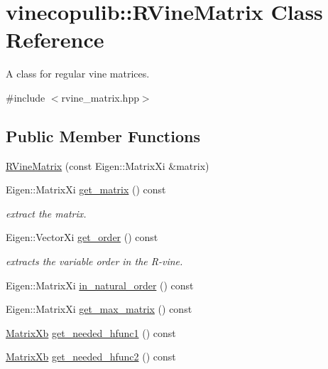 \hypertarget{classvinecopulib_1_1_r_vine_matrix}{}\section{vinecopulib\+:\+:R\+Vine\+Matrix Class Reference}
\label{classvinecopulib_1_1_r_vine_matrix}


A class for regular vine matrices.  




{\ttfamily \#include $<$rvine\+\_\+matrix.\+hpp$>$}

\subsection*{Public Member Functions}
\begin{DoxyCompactItemize}
\item 
\hyperlink{classvinecopulib_1_1_r_vine_matrix_a5872c479d4a7de9c2ddc64cdb0909ef9}{R\+Vine\+Matrix} (const Eigen\+::\+Matrix\+Xi \&matrix)
\item 
Eigen\+::\+Matrix\+Xi \hyperlink{classvinecopulib_1_1_r_vine_matrix_aef1ea47e9fcbcd32337b2db508b25fdb}{get\+\_\+matrix} () const \hypertarget{classvinecopulib_1_1_r_vine_matrix_aef1ea47e9fcbcd32337b2db508b25fdb}{}\label{classvinecopulib_1_1_r_vine_matrix_aef1ea47e9fcbcd32337b2db508b25fdb}

\begin{DoxyCompactList}\small\item\em extract the matrix. \end{DoxyCompactList}\item 
Eigen\+::\+Vector\+Xi \hyperlink{classvinecopulib_1_1_r_vine_matrix_a8ce7f93504e7c219ca9da89e1d97a34b}{get\+\_\+order} () const \hypertarget{classvinecopulib_1_1_r_vine_matrix_a8ce7f93504e7c219ca9da89e1d97a34b}{}\label{classvinecopulib_1_1_r_vine_matrix_a8ce7f93504e7c219ca9da89e1d97a34b}

\begin{DoxyCompactList}\small\item\em extracts the variable order in the R-\/vine. \end{DoxyCompactList}\item 
Eigen\+::\+Matrix\+Xi \hyperlink{classvinecopulib_1_1_r_vine_matrix_a88673df07f4aae0e0e0a65faff2418b6}{in\+\_\+natural\+\_\+order} () const 
\item 
Eigen\+::\+Matrix\+Xi \hyperlink{classvinecopulib_1_1_r_vine_matrix_a674074d4e248868a01155a25f775ae3a}{get\+\_\+max\+\_\+matrix} () const 
\item 
\hyperlink{namespacetools__eigen_ad496806a2d02c8e881330d95e0c150aa}{Matrix\+Xb} \hyperlink{classvinecopulib_1_1_r_vine_matrix_a6303fc1f643fdf793c867ca7e08e42bc}{get\+\_\+needed\+\_\+hfunc1} () const 
\item 
\hyperlink{namespacetools__eigen_ad496806a2d02c8e881330d95e0c150aa}{Matrix\+Xb} \hyperlink{classvinecopulib_1_1_r_vine_matrix_a7ac32cf10a966ba567142e9b36106746}{get\+\_\+needed\+\_\+hfunc2} () const 
\end{DoxyCompactItemize}
